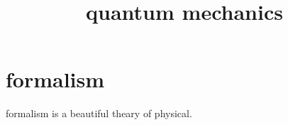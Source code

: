 \documentclass{article}
\begin{document}
\title{quantum mechanics}
\section{formalism}

formalism is a beautiful theary of physical.
\end{document}
